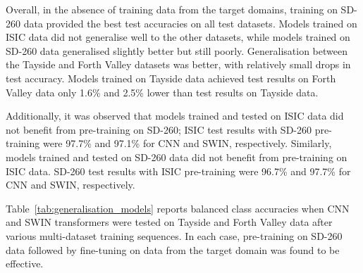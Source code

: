 Overall, in the absence of training data from the target domains, training on SD-260 data provided the best test accuracies on all test datasets. Models trained on ISIC data did not generalise well to the other datasets, while models trained on SD-260 data generalised slightly better but still poorly. Generalisation between the Tayside and Forth Valley datasets was better, with relatively small drops in test accuracy. Models trained on Tayside data achieved test results on Forth Valley data only 1.6\% and 2.5\% lower than test results on Tayside data.

Additionally, it was observed that models trained and tested on ISIC data did not benefit from pre-training on SD-260; ISIC test results with SD-260 pre-training were 97.7\% and 97.1\% for CNN and SWIN, respectively. Similarly, models trained and tested on SD-260 data did not benefit from pre-training on ISIC data. SD-260 test results with ISIC pre-training were 96.7\% and 97.7\% for CNN and SWIN, respectively.

Table~\ref{tab:generalisation_models} reports balanced class accuracies when CNN and SWIN transformers were tested on Tayside and Forth Valley data after various multi-dataset training sequences. In each case, pre-training on SD-260 data followed by fine-tuning on data from the target domain was found to be effective.


